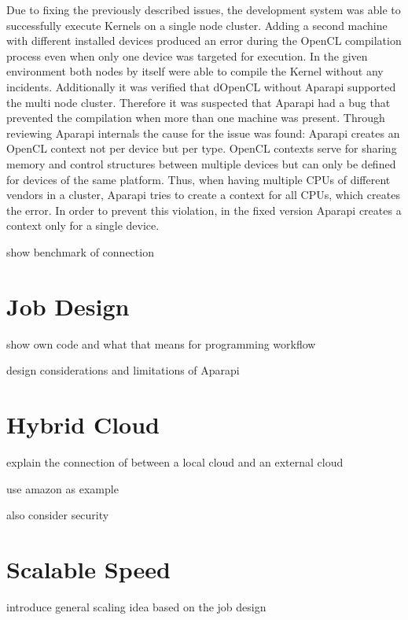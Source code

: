 \begin{description}[style=nextline]
	\item [Failed compilations when using multiple devices]
	Due to fixing the previously described issues, the development system was able to successfully execute Kernels on a single node cluster. Adding a second machine with different installed devices produced an error during the OpenCL compilation process even when only one device was targeted for execution. In the given environment both nodes by itself were able to compile the Kernel without any incidents. Additionally it was verified that dOpenCL without Aparapi supported the multi node cluster. Therefore it was suspected that Aparapi had a bug that prevented the compilation when more than one machine was present. Through reviewing Aparapi internals the cause for the issue was found: Aparapi creates an OpenCL context not per device but per type. OpenCL contexts serve for sharing memory and control structures between multiple devices but can only be defined for devices of the same platform. Thus, when having multiple CPUs of different vendors in a cluster, Aparapi tries to create a context for all CPUs, which creates the error. In order to prevent this violation, in the fixed version Aparapi creates a context only for a single device.
	
\end{description} 
 

show benchmark of connection

\section{Job Design}

show own code and what that means for programming workflow

design considerations and limitations of Aparapi

\section{Hybrid Cloud}

explain the connection of between a local cloud and an external cloud

use amazon as example

also consider security

\section{Scalable Speed}

introduce general scaling idea based on the job design

